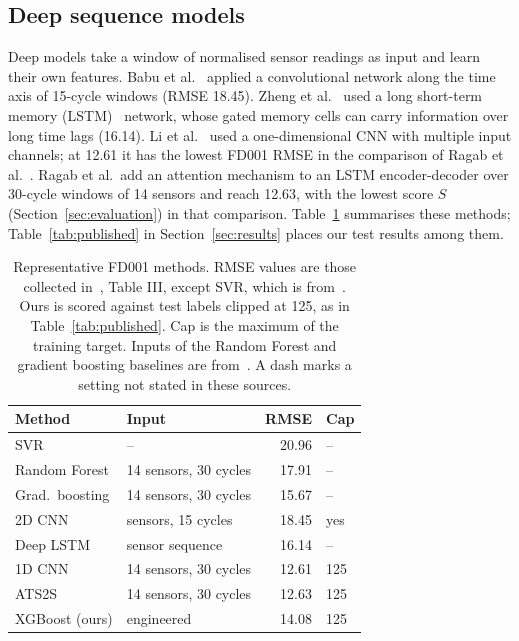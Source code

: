 \subsection{Deep sequence models}
Deep models take a window of normalised sensor readings as input and learn
their own features. Babu et al.~\cite{babu2016cnn} applied a convolutional
network along the time axis of 15-cycle windows (RMSE 18.45). Zheng et
al.~\cite{zheng2017lstm} used a long short-term memory
(LSTM)~\cite{hochreiter1997lstm} network, whose gated memory cells can carry
information over long time lags (16.14). Li et al.~\cite{li2018dcnn}
used a one-dimensional CNN with multiple input channels; at 12.61 it has
the lowest FD001 RMSE in the comparison of Ragab et
al.~\cite{ragab2020attention}. Ragab et al.\ add an attention mechanism
to an LSTM encoder-decoder over 30-cycle windows of 14 sensors and reach
12.63, with the lowest score $S$ (Section~\ref{sec:evaluation}) in that
comparison. Table~\ref{tab:related} summarises these methods;
Table~\ref{tab:published} in Section~\ref{sec:results} places our test
results among them.

\begin{table}[t]
\centering
\caption{Representative FD001 methods. RMSE values are those collected
in~\cite{ragab2020attention}, Table III, except SVR, which is
from~\cite{babu2016cnn}. Ours is scored against test labels clipped at 125,
as in Table~\ref{tab:published}. Cap is the maximum of the training
target. Inputs of the Random Forest and gradient boosting baselines are
from~\cite{zhang2017thesis}. A dash marks a setting not stated in these
sources.}
\label{tab:related}
\footnotesize
\begin{tabular}{llrl}
\hline
Method & Input & RMSE & Cap \\
\hline
SVR \cite{babu2016cnn}                 & --                    & 20.96 & -- \\
Random Forest \cite{zhang2017modbne}   & 14 sensors, 30 cycles & 17.91 & -- \\
Grad.\ boosting \cite{zhang2017modbne} & 14 sensors, 30 cycles & 15.67 & -- \\
2D CNN \cite{babu2016cnn}              & sensors, 15 cycles    & 18.45 & yes \\
Deep LSTM \cite{zheng2017lstm}         & sensor sequence       & 16.14 & -- \\
1D CNN \cite{li2018dcnn}               & 14 sensors, 30 cycles & 12.61 & 125 \\
ATS2S \cite{ragab2020attention}        & 14 sensors, 30 cycles & 12.63 & 125 \\
XGBoost (ours)                         & engineered            & 14.08 & 125 \\
\hline
\end{tabular}
\end{table}

